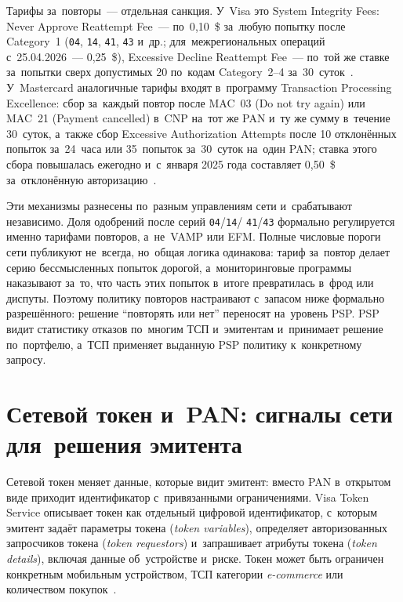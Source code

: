 Тарифы за~повторы~--- отдельная санкция. У~Visa это System Integrity Fees:
Never Approve Reattempt Fee~--- по~0{,}10~\$
за~любую попытку после Category~1 (\texttt{04}, \texttt{14}, \texttt{41},
\texttt{43} и~др.; для~межрегиональных операций с~25.04.2026~--- 0{,}25~\$),
Excessive Decline Reattempt Fee~--- по~той же ставке
за~попытки сверх допустимых 20 по~кодам Category~2--4 за~30~суток~\cite{visa-core-rules,chargebacks911-visa-reattempts}.
У~Mastercard аналогичные тарифы входят в~программу Transaction Processing
Excellence: сбор за~каждый повтор после MAC~03 (Do not try again) или MAC~21 (Payment
cancelled) в~CNP на~тот же PAN и~ту же сумму в~течение 30~суток, а~также сбор
Excessive Authorization Attempts после 10 отклонённых попыток за~24~часа или
35~попыток за~30~суток на~один PAN; ставка этого сбора повышалась ежегодно
и~с~января 2025 года составляет 0{,}50~\$ за~отклонённую
авторизацию~\cite{tabapay-mac,verisave-mc-rate-changes}.

Эти механизмы разнесены по~разным управлениям сети и~срабатывают независимо.
Доля одобрений после серий \texttt{04}/\texttt{14}/ \texttt{41}/\texttt{43}
формально регулируется именно тарифами повторов, а~не~VAMP или EFM. Полные
числовые пороги сети публикуют не~всегда, но~общая логика одинакова: тариф
за~повтор делает серию бессмысленных попыток дорогой, а~мониторинговые
программы наказывают за~то, что часть этих попыток в~итоге превратилась в~фрод
или диспуты. Поэтому политику повторов настраивают с~запасом ниже
формально разрешённого: решение \enquote{повторять или нет} переносят
на~уровень PSP. PSP видит статистику отказов по~многим ТСП и~эмитентам
и~принимает решение по~портфелю, а~ТСП применяет выданную PSP политику
к~конкретному запросу.

\section{Сетевой токен и~PAN: сигналы сети для~решения эмитента}\label{sec:decline-tokens}

Сетевой токен меняет данные, которые видит эмитент: вместо PAN в~открытом виде
приходит идентификатор с~привязанными ограничениями. Visa Token Service
описывает токен как отдельный цифровой идентификатор, с~которым эмитент задаёт
параметры токена (\textit{token variables}), определяет авторизованных
запросчиков токена (\textit{token requestors}) и~запрашивает атрибуты токена
(\textit{token details}), включая данные об~устройстве и~риске. Токен может быть
ограничен конкретным мобильным устройством, ТСП категории \textit{e-commerce}
или количеством покупок~\cite{visa-vts,emvco-payment-tokenisation-guide}.

